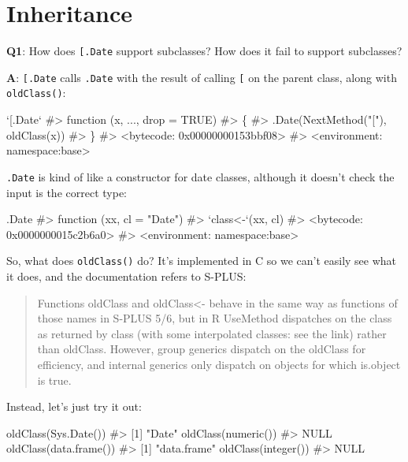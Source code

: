 \documentclass[
]{krantz}
\makeatletter
\newenvironment{Shaded}{\begin{snugshade}}{\end{snugshade}}
\newcommand{\CommentTok}[1]{\textcolor[rgb]{0.56,0.35,0.01}{\textit{#1}}}
\newcommand{\DataTypeTok}[1]{\textcolor[rgb]{0.13,0.29,0.53}{#1}}
\newcommand{\KeywordTok}[1]{\textcolor[rgb]{0.13,0.29,0.53}{\textbf{#1}}}
\newcommand{\NormalTok}[1]{#1}
\newcommand{\StringTok}[1]{\textcolor[rgb]{0.31,0.60,0.02}{#1}}
\newenvironment{kframe}{%
\medskip{}
\setlength{\fboxsep}{.8em}
 \def\at@end@of@kframe{}%
 \ifinner\ifhmode%
  \def\at@end@of@kframe{\end{minipage}}%
  \begin{minipage}{\columnwidth}%
 \fi\fi%
 \def\FrameCommand##1{\hskip\@totalleftmargin \hskip-\fboxsep
 \colorbox{shadecolor}{##1}\hskip-\fboxsep
     \hskip-\linewidth \hskip-\@totalleftmargin \hskip\columnwidth}%
 \MakeFramed {\advance\hsize-\width
   \@totalleftmargin\z@ \linewidth\hsize
   \@setminipage}}%
 {\par\unskip\endMakeFramed%
 \at@end@of@kframe}
\renewenvironment{Shaded}{\begin{kframe}}{\end{kframe}}
\renewcommand{\KeywordTok} [1]{\textcolor[rgb]{0.00,0.44,0.13}{{#1}}}
\renewcommand{\DataTypeTok}[1]{\textcolor[rgb]{0.56,0.13,0.00}{{#1}}}
\renewcommand{\StringTok}  [1]{\textcolor[rgb]{0.25,0.44,0.63}{{#1}}}
\renewcommand{\CommentTok} [1]{\textcolor[rgb]{0.38,0.63,0.69}{{#1}}}
\renewcommand{\NormalTok}  [1]{{#1}}
\makeatother
\begin{document}
\hypertarget{inheritance}{%
\section{Inheritance}\label{inheritance}}

\textbf{{Q1}}: How does \texttt{{[}.Date} support subclasses? How does it fail to support subclasses?

\textbf{{A}}: \texttt{{[}.Date} calls \texttt{.Date} with the result of calling \texttt{{[}} on the parent class, along with \texttt{oldClass()}:

\begin{Shaded}
\begin{Highlighting}[]
\StringTok{`}\DataTypeTok{[.Date}\StringTok{`}
\CommentTok{#> function (x, ..., drop = TRUE) }
\CommentTok{#> \{}
\CommentTok{#>     .Date(NextMethod("["), oldClass(x))}
\CommentTok{#> \}}
\CommentTok{#> <bytecode: 0x00000000153bbf08>}
\CommentTok{#> <environment: namespace:base>}
\end{Highlighting}
\end{Shaded}

\texttt{.Date} is kind of like a constructor for date classes, although it doesn't check the input is the correct type:

\begin{Shaded}
\begin{Highlighting}[]
\NormalTok{.Date}
\CommentTok{#> function (xx, cl = "Date") }
\CommentTok{#> `class<-`(xx, cl)}
\CommentTok{#> <bytecode: 0x0000000015c2b6a0>}
\CommentTok{#> <environment: namespace:base>}
\end{Highlighting}
\end{Shaded}

So, what does \texttt{oldClass()} do? It's implemented in C so we can't easily see what it does, and the documentation refers to S-PLUS:

\begin{quote}
Functions oldClass and oldClass\textless- behave in the same way as functions of those names in S-PLUS 5/6, but in R UseMethod dispatches on the class as returned by class (with some interpolated classes: see the link) rather than oldClass. However, group generics dispatch on the oldClass for efficiency, and internal generics only dispatch on objects for which is.object is true.
\end{quote}

Instead, let's just try it out:

\begin{Shaded}
\begin{Highlighting}[]
\KeywordTok{oldClass}\NormalTok{(}\KeywordTok{Sys.Date}\NormalTok{())}
\CommentTok{#> [1] "Date"}
\KeywordTok{oldClass}\NormalTok{(}\KeywordTok{numeric}\NormalTok{())}
\CommentTok{#> NULL}
\KeywordTok{oldClass}\NormalTok{(}\KeywordTok{data.frame}\NormalTok{())}
\CommentTok{#> [1] "data.frame"}
\KeywordTok{oldClass}\NormalTok{(}\KeywordTok{integer}\NormalTok{())}
\CommentTok{#> NULL}
\end{Highlighting}
\end{Shaded}
\end{document}
